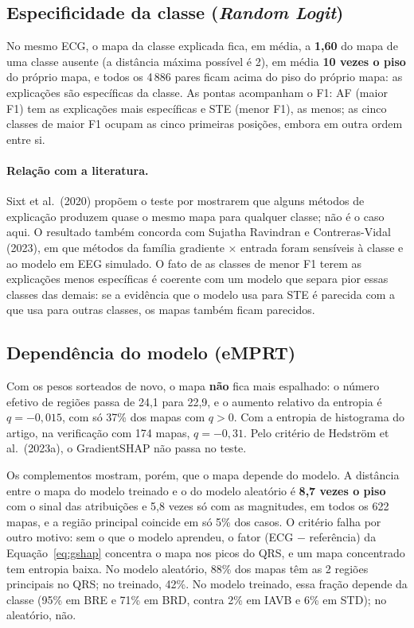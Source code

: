\documentclass[11pt,a4paper]{article}
\newcommand{\RL}{\textit{Random Logit}}
\newcommand{\EM}{eMPRT}
\begin{document}
\subsection{Especificidade da classe (\RL)}\label{sec:res-rlogit}
No mesmo ECG, o mapa da classe explicada fica, em média, a \textbf{1,60} do mapa de uma classe ausente (a distância máxima possível é 2), em média \textbf{10 vezes o piso} do próprio mapa, e todos os 4\,886 pares ficam acima do piso do próprio mapa: as explicações são específicas da classe. As pontas acompanham o F1: AF (maior F1) tem as explicações mais específicas e STE (menor F1), as menos; as cinco classes de maior F1 ocupam as cinco primeiras posições, embora em outra ordem entre si.

\paragraph{Relação com a literatura.} Sixt et al.\ (2020) propõem o teste por mostrarem que alguns métodos de explicação produzem quase o mesmo mapa para qualquer classe; não é o caso aqui. O resultado também concorda com Sujatha Ravindran e Contreras-Vidal (2023), em que métodos da família gradiente × entrada foram sensíveis à classe e ao modelo em EEG simulado. O fato de as classes de menor F1 terem as explicações menos específicas é coerente com um modelo que separa pior essas classes das demais: se a evidência que o modelo usa para STE é parecida com a que usa para outras classes, os mapas também ficam parecidos.

\subsection{Dependência do modelo (\EM)}\label{sec:res-emprt}
Com os pesos sorteados de novo, o mapa \textbf{não} fica mais espalhado: o número efetivo de regiões passa de 24,1 para 22,9, e o aumento relativo da entropia é $q = -0{,}015$, com só 37\% dos mapas com $q > 0$. Com a entropia de histograma do artigo, na verificação com 174 mapas, $q = -0{,}31$. Pelo critério de Hedström et al.\ (2023a), o GradientSHAP não passa no teste.

Os complementos mostram, porém, que o mapa depende do modelo. A distância entre o mapa do modelo treinado e o do modelo aleatório é \textbf{8,7 vezes o piso} com o sinal das atribuições e 5,8 vezes só com as magnitudes, em todos os 622 mapas, e a região principal coincide em só 5\% dos casos. O critério falha por outro motivo: sem o que o modelo aprendeu, o fator (ECG $-$ referência) da Equação~\ref{eq:gshap} concentra o mapa nos picos do QRS, e um mapa concentrado tem entropia baixa. No modelo aleatório, 88\% dos mapas têm as 2 regiões principais no QRS; no treinado, 42\%. No modelo treinado, essa fração depende da classe (95\% em BRE e 71\% em BRD, contra 2\% em IAVB e 6\% em STD); no aleatório, não.
\end{document}
